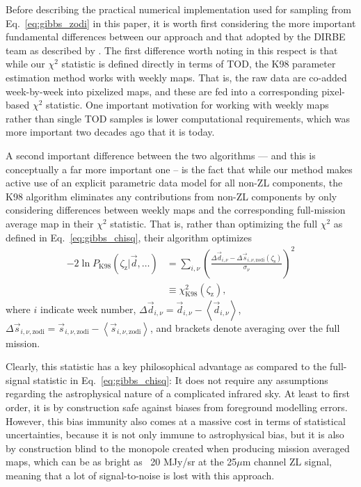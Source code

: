 \documentclass[twocolumn]{aa}
\newcommand{\dv}[0]{\vec{d}}
\newcommand{\s}[0]{\vec{s}}
\begin{document}
Before describing the practical numerical implementation used for
sampling from Eq.~\eqref{eq:gibbs_zodi} in this paper, it is worth
first considering the more important fundamental differences between
our approach and that adopted by the DIRBE team as described by
\citet{Kelsall1998}. The first difference worth noting in this respect
is that while our $\chi^2$ statistic is defined directly in terms of
TOD, the K98 parameter estimation method works with weekly maps. That
is, the raw data are co-added week-by-week into pixelized maps, and
these are fed into a corresponding pixel-based $\chi^2$ statistic. One
important motivation for working with weekly maps rather than single
TOD samples is lower computational requirements, which was more
important two decades ago that it is today.

A second important difference between the two algorithms --- and this
is conceptually a far more important one -- is the fact that while our
method makes active use of an explicit parametric data model for all
non-ZL components, the K98 algorithm eliminates any contributions from
non-ZL components by only considering differences between weekly maps
and the corresponding full-mission average map in their $\chi^2$
statistic. That is, rather than optimizing the full $\chi^2$ as
defined in Eq.~\eqref{eq:gibbs_chisq}, their algorithm optimizes
\begin{align}
  -2\ln P_{\mathrm{K98}}(\zeta_{\mathrm{z}}|\dv, \ldots) &= \sum_{i,\nu}
  \left(\frac{\Delta\dv_{i,\nu} -
    \Delta\s_{i,\nu,\mathrm{zodi}}(\zeta_\mathrm{s})}{\sigma_{\nu}}\right)^2 \\&\equiv
  \chi^2_{\mathrm{K98}} (\zeta_{\mathrm{z}}),
  \label{eq:k98_chisq}
\end{align}
where $i$ indicate week number, $\Delta \dv_{i,\nu} = \dv_{i,\nu} -
\left<\dv_{i,\nu}\right>$, $\Delta \s_{i,\nu,\mathrm{zodi}} =
\s_{i,\nu,\mathrm{zodi}} - \left<\s_{i,\nu,\mathrm{zodi}}\right>$, and brackets
denote averaging over the full mission.

Clearly, this statistic has a key philosophical advantage as compared
to the full-signal statistic in Eq.~\eqref{eq:gibbs_chisq}: It does
not require any assumptions regarding the astrophysical nature of a 
complicated infrared sky. At least to first order, it is by
construction safe against biases from foreground modelling
errors. However, this bias immunity also comes at a massive cost in
terms of statistical uncertainties, because it is not only immune to
astrophysical bias, but it is also by construction blind to the monopole 
created when producing mission averaged maps, which can be as bright as 
~20 MJy/sr at the 25$\mu$m channel ZL signal, meaning that a lot of 
signal-to-noise is lost with this approach.
\end{document}

